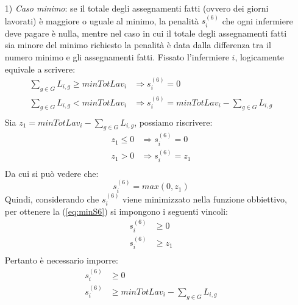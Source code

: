 \begin{itemize}

\item [1)] \textit{Caso minimo}: se il totale degli assegnamenti fatti (ovvero dei giorni lavorati) è maggiore o uguale al minimo, la penalità $s^{(6)}_{i}$ che ogni infermiere deve pagare è nulla, mentre nel caso in cui il totale degli assegnamenti fatti sia minore del minimo richiesto la penalità è data dalla differenza tra il numero minimo e gli assegnamenti fatti. Fissato l'infermiere $i$, logicamente equivale a scrivere:
\begin{equation}
\begin{split}
\sum_{g \in G} L_{i, g} \geq minTotLav_i &\Longrightarrow s^{(6)}_{i} = 0 \\
\sum_{g \in G} L_{i, g} < minTotLav_i &\Longrightarrow s^{(6)}_{i} = minTotLav_i - \sum_{g \in G} L_{i, g} \\
\end{split}
\end{equation}
Sia $z_1 = minTotLav_i - \sum_{g \in G} L_{i, g}$, possiamo riscrivere:
\begin{equation}
\begin{split}
z_1 \leq 0 &\Longrightarrow s^{(6)}_{i} = 0 \\
z_1 > 0 &\Longrightarrow s^{(6)}_{i} = z_1 \\
\end{split}
\end{equation}
Da cui si può vedere che:
\begin{equation}
\label{eq:minS6}
s^{(6)}_{i} = max(0, z_1)
\end{equation}
Quindi, considerando che $s^{(6)}_{i}$ viene minimizzato nella funzione obbiettivo, per ottenere la (\ref{eq:minS6}) si impongono i seguenti vincoli:
\begin{equation}
\begin{split}
s^{(6)}_{i} &\geq 0 \\
s^{(6)}_{i} &\geq z_1 \\
\end{split}
\end{equation}
Pertanto è necessario imporre:
\begin{equation}
\begin{split}
s^{(6)}_{i} &\geq 0 \\
s^{(6)}_{i} &\geq minTotLav_i - \sum_{g \in G} L_{i, g} \\
\end{split}
\end{equation}


\end{itemize}
